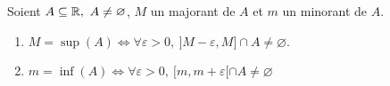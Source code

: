 \begin{proposition}
    Soient $A \subseteq \mathbb{R},\ A \neq \varnothing$, $M$ un majorant de $A$ et $m$ un minorant de $A$.  
    \begin{enumerate}
        \item $M = \sup(A) \iff \forall \varepsilon > 0,\ ]M - \varepsilon, M] \cap A \neq \varnothing$.
        \item $m = \inf(A) \iff \forall \varepsilon > 0,\ [m, m + \varepsilon[ \cap A \neq \varnothing $
    \end{enumerate}
\end{proposition}